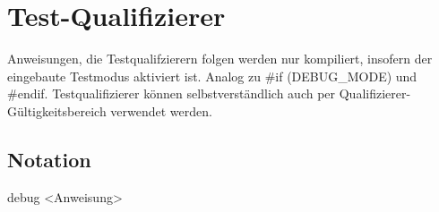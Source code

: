 \chapter{Test-Qualifizierer}
Anweisungen, die Testqualifzierern folgen werden nur kompiliert, insofern der eingebaute Testmodus aktiviert ist.
Analog zu #if (DEBUG_MODE) und #endif.
Testqualifizierer können selbstverständlich auch per Qualifizierer-Gültigkeitsbereich verwendet werden.

\section{Notation}
debug <Anweisung>